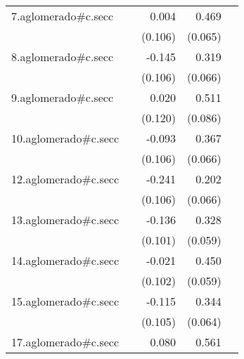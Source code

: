 {\begin{longtable}{l*{4}{D{.}{.}{-1}}}
\addlinespace
7.aglomerado#c.secc&                     &       0.004         &       0.469\sym{***}&                     \\
            &                     &     (0.106)         &     (0.065)         &                     \\
\addlinespace
8.aglomerado#c.secc&                     &      -0.145         &       0.319\sym{***}&                     \\
            &                     &     (0.106)         &     (0.066)         &                     \\
\addlinespace
9.aglomerado#c.secc&                     &       0.020         &       0.511\sym{***}&                     \\
            &                     &     (0.120)         &     (0.086)         &                     \\
\addlinespace
10.aglomerado#c.secc&                     &      -0.093         &       0.367\sym{***}&                     \\
            &                     &     (0.106)         &     (0.066)         &                     \\
\addlinespace
12.aglomerado#c.secc&                     &      -0.241\sym{*}  &       0.202\sym{**} &                     \\
            &                     &     (0.106)         &     (0.066)         &                     \\
\addlinespace
13.aglomerado#c.secc&                     &      -0.136         &       0.328\sym{***}&                     \\
            &                     &     (0.101)         &     (0.059)         &                     \\
\addlinespace
14.aglomerado#c.secc&                     &      -0.021         &       0.450\sym{***}&                     \\
            &                     &     (0.102)         &     (0.059)         &                     \\
\addlinespace
15.aglomerado#c.secc&                     &      -0.115         &       0.344\sym{***}&                     \\
            &                     &     (0.105)         &     (0.064)         &                     \\
\addlinespace
17.aglomerado#c.secc&                     &       0.080         &       0.561\sym{***}&                     \\

\end{longtable}}
